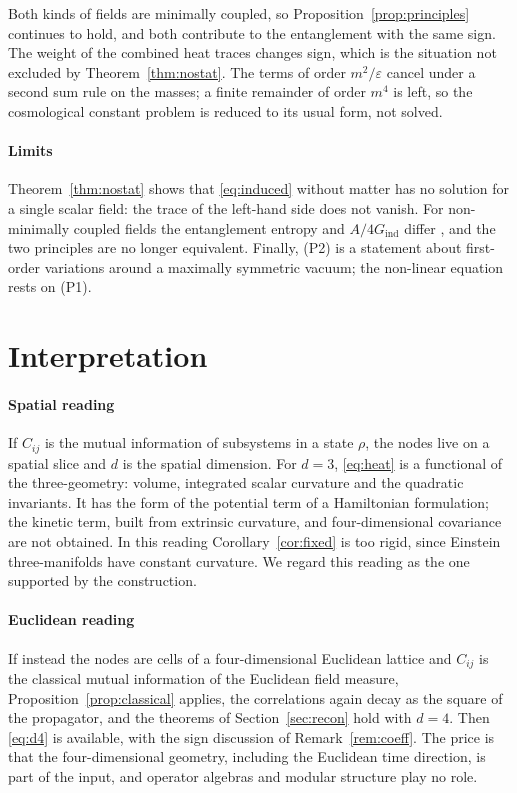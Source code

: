 \documentclass[11pt,a4paper]{article}
\theoremstyle{stmt}
\theoremstyle{defn}
\theoremstyle{rmk}
\numberwithin{equation}{section}
\begin{document}
Both kinds of fields are minimally coupled, so Proposition~\ref{prop:principles} continues to hold, and both contribute to the entanglement with the same sign. The weight of the combined heat traces changes sign, which is the situation not excluded by Theorem~\ref{thm:nostat}. The terms of order $m^2/\varepsilon$ cancel under a second sum rule on the masses; a finite remainder of order $m^4$ is left, so the cosmological constant problem is reduced to its usual form, not solved.

\paragraph{Limits} Theorem~\ref{thm:nostat} shows that \eqref{eq:induced} without matter has no solution for a single scalar field: the trace of the left-hand side does not vanish. For non-minimally coupled fields the entanglement entropy and $A/4G_{\mathrm{ind}}$ differ \cite{Solodukhin}, and the two principles are no longer equivalent. Finally, (P2) is a statement about first-order variations around a maximally symmetric vacuum; the non-linear equation rests on (P1).

\section{Interpretation}\label{sec:reading}

\paragraph{Spatial reading} If $C_{ij}$ is the mutual information of subsystems in a state $\rho$, the nodes live on a spatial slice and $d$ is the spatial dimension. For $d=3$, \eqref{eq:heat} is a functional of the three-geometry: volume, integrated scalar curvature and the quadratic invariants. It has the form of the potential term of a Hamiltonian formulation; the kinetic term, built from extrinsic curvature, and four-dimensional covariance are not obtained. In this reading Corollary~\ref{cor:fixed} is too rigid, since Einstein three-manifolds have constant curvature. We regard this reading as the one supported by the construction.

\paragraph{Euclidean reading} If instead the nodes are cells of a four-dimensional Euclidean lattice and $C_{ij}$ is the classical mutual information of the Euclidean field measure, Proposition~\ref{prop:classical} applies, the correlations again decay as the square of the propagator, and the theorems of Section~\ref{sec:recon} hold with $d=4$. Then \eqref{eq:d4} is available, with the sign discussion of Remark~\ref{rem:coeff}. The price is that the four-dimensional geometry, including the Euclidean time direction, is part of the input, and operator algebras and modular structure play no role.
\end{document}
